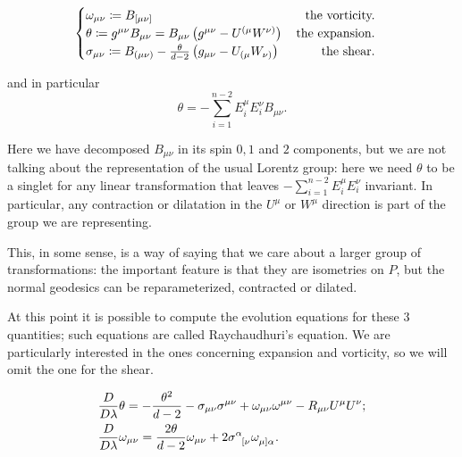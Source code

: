 	\begin{equation}
	\label{eq:def-expansion-vorticity-shear}
		\begin{cases}
		\omega_{\mu\nu} \coloneqq B_{[\mu\nu]} \hfill \text{the vorticity.} \\
		\theta \coloneqq g^{\mu\nu}B_{\mu\nu}  = B_{\mu\nu} \left(g^{\mu\nu} - U^{(\mu}W^{\nu)}\right) \hfill \quad \text{the expansion.} \\
		\sigma_{\mu\nu} \coloneqq B_{(\mu\nu)} - \frac{\theta}{d - 2}\left(g_{\mu\nu} - U_{(\mu}W_{\nu)}\right) \hfill \quad \text{ the shear.}
		\end{cases}
	\end{equation}
	
	and in particular
	\[
	\theta = - \sum_{i=1}^{n - 2}E_i^{\mu}E_i^{\nu} B_{\mu\nu}.
	\]
	\begin{remark}
		Here we have decomposed \(B_{\mu\nu}\) in its spin \(0, 1\) and \(2\) components, but we are not talking about the representation of the usual Lorentz group: here we need \(\theta\) to be a singlet for any linear transformation that leaves \(- \sum_{i=1}^{n - 2}E_i^{\mu}E_i^{\nu}\) invariant. In particular, any contraction or dilatation in the \(U^{\mu}\) or \(W^{\mu}\) direction is part of the group we are representing.
		
		This, in some sense, is a way of saying that we care about a larger group of transformations: the important feature is that they are isometries on \(P\), but the normal geodesics can be reparameterized, contracted or dilated.
	\end{remark}
	
	At this point it is possible to compute the evolution equations for these \(3\) quantities; such equations are called Raychaudhuri's equation.
	We are particularly interested in the ones concerning expansion and vorticity, so we will omit the one for the shear.
	
	\begin{align}
		\label{eq:Raychaudhuri-theta}
		&\frac{D}{D\lambda}\theta = -\frac{\theta^2}{d - 2} - \sigma_{\mu\nu}\sigma^{\mu\nu} + \omega_{\mu\nu}\omega^{\mu\nu}  - R_{\mu\nu}U^{\mu}U^{\nu}; \\
		\label{eq:Raychaudhuri-vorticity}
		&\frac{D}{D\lambda}\omega_{\mu\nu} = \frac{2\theta}{d - 2}\omega_{\mu\nu} + 2\sigma\indices{^{\alpha}_{[\nu}}\omega\indices{_{\mu]\alpha}}.
	\end{align}
	
